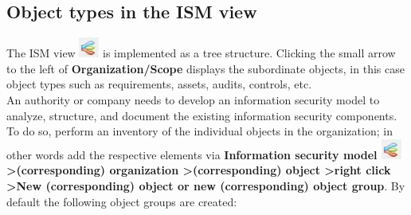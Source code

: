 \documentclass[a4paper,10pt]{book}
\begin{document}
\subsection{Object types in the ISM view}
The ISM view \includegraphics[height=2ex]{Icon/Informationssicherheitsmodell.png}
is implemented as a tree structure. Clicking the small arrow to the left of \textbf{Organization/Scope}
displays the subordinate objects, in this case object types such as requirements, assets, audits, controls, etc.
\newline\\
An authority or company needs to develop an information security model to analyze, structure,
and document the existing information security components. To do so, perform an inventory of
the individual objects in the organization; in other words add the respective elements via
\textbf{Information security model \includegraphics[height=2ex]{Icon/Informationssicherheitsmodell.png}
\textgreater (corresponding) organization \textgreater (corresponding) object
\textgreater right click \textgreater New (corresponding) object or new (corresponding) object group}.
By default the following object groups are created:
\end{document}
